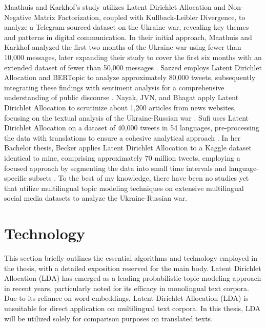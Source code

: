 \documentclass[
    11pt,
    a4paper,
    egregdoesnotlikesansseriftitles,
    toc=chapterentrywithdots,
    oneside,openright,
    titlepage,
    parskip=half,
    headings=normal,  %
    listof=totoc,
    bibliography=totoc,
    index=totoc,
    captions=tableheading,  %
    chapterprefix,
    listof=flat,
    final
]{scrbook}
\begin{document}
Maathuis and Karkhof's study utilizes Latent Dirichlet Allocation and Non-Negative Matrix Factorization, coupled with Kullback-Leibler Divergence, to analyze a Telegram-sourced dataset on the Ukraine war, revealing key themes and patterns in digital communication.
In their initial approach, Maathuis and Karkhof analyzed the first two months of the Ukraine war using fewer than 10,000 messages, later expanding their study to cover the first six months with an extended dataset of fewer than 50,000 messages \cite{TopicModellingTelegram1,TopicModellingTelegram2}. 
Sazzed employs Latent Dirichlet Allocation and BERTopic to analyze approximately 80,000 tweets, subsequently integrating these findings with sentiment analysis for a comprehensive understanding of public discourse \cite{TopicTwitterLDABERt}. 
Nayak, JVN, and Bhagat apply Latent Dirichlet Allocation to scrutinize about 1,200 articles from news websites, focusing on the textual analysis of the Ukraine-Russian war \cite{TopicModelingconflig}.
Sufi uses Latent Dirichlet Allocation on a dataset of 40,000 tweets in 54 languages, pre-processing the data with translations to ensure a cohesive analytical approach \cite{SocialMediaanalysis}.
In her Bachelor thesis, Becker applies Latent Dirichlet Allocation to a Kaggle dataset identical to mine, comprising approximately 70 million tweets, employing a focused approach by segmenting the data into small time intervals and language-specific subsets \cite{Ivanna}.
To the best of my knowledge, there have been no studies yet that utilize multilingual topic modeling techniques on extensive multilingual social media datasets to analyze the Ukraine-Russian war.



{\let\clearpage\relax \chapter{Technology}}
This section briefly outlines the essential algorithms and technology employed in the thesis, with a detailed exposition reserved for the main body.
Latent Dirichlet Allocation (LDA)  \cite{LDA} has emerged as a leading probabilistic topic modeling approach in recent years, particularly noted for its efficacy in monolingual text corpora. Due to its reliance on word embeddings, Latent Dirichlet Allocation (LDA) is unsuitable for direct application on multilingual text corpora. In this thesis, LDA will be utilized solely for comparison purposes on translated texts.
\end{document}
